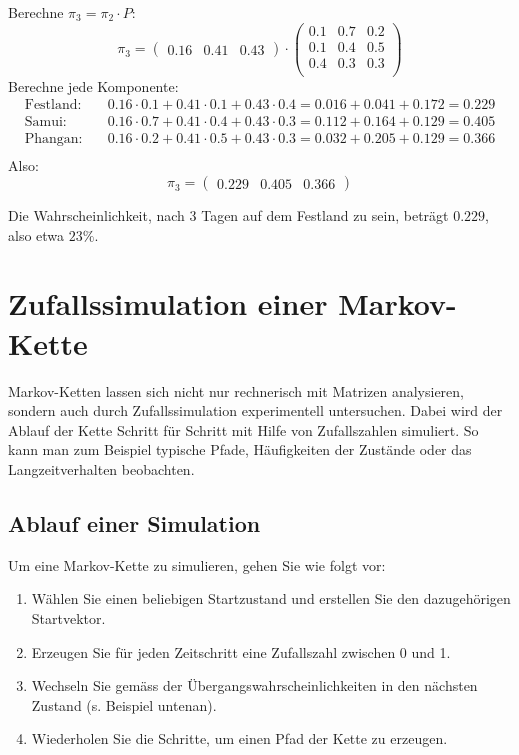 \begin{mychallenge}
\begin{myanswer}
        Berechne $\pi_3 = \pi_2 \cdot P$:
        \[
            \pi_3 = \begin{pmatrix} 0.16 & 0.41 & 0.43 \end{pmatrix}
            \cdot
            \begin{pmatrix}
                0.1 & 0.7 & 0.2 \\
                0.1 & 0.4 & 0.5 \\
                0.4 & 0.3 & 0.3 \\
            \end{pmatrix}
        \]
        Berechne jede Komponente:
        \begin{align*}
            \text{Festland:} & \quad 0.16 \cdot 0.1 + 0.41 \cdot 0.1 + 0.43 \cdot 0.4 = 0.016 + 0.041 + 0.172 = 0.229 \\
            \text{Samui:}    & \quad 0.16 \cdot 0.7 + 0.41 \cdot 0.4 + 0.43 \cdot 0.3 = 0.112 + 0.164 + 0.129 = 0.405 \\
            \text{Phangan:}  & \quad 0.16 \cdot 0.2 + 0.41 \cdot 0.5 + 0.43 \cdot 0.3 = 0.032 + 0.205 + 0.129 = 0.366 \\
        \end{align*}
        Also:
        \[
            \pi_3 = \begin{pmatrix} 0.229 & 0.405 & 0.366 \end{pmatrix}
        \]

        Die Wahrscheinlichkeit, nach 3 Tagen auf dem Festland zu sein, beträgt $0.229$, also etwa $23\%$.
    \end{myanswer}
\end{mychallenge}


\section{Zufallssimulation einer Markov-Kette}

Markov-Ketten lassen sich nicht nur rechnerisch mit Matrizen analysieren, sondern auch durch Zufallssimulation experimentell untersuchen. Dabei wird der Ablauf der Kette Schritt für Schritt mit Hilfe von Zufallszahlen simuliert. So kann man zum Beispiel typische Pfade, Häufigkeiten der Zustände oder das Langzeitverhalten beobachten.

\subsection{Ablauf einer Simulation}

Um eine Markov-Kette zu simulieren, gehen Sie wie folgt vor:
\begin{enumerate}
    \item Wählen Sie einen beliebigen Startzustand und erstellen Sie den dazugehörigen Startvektor.
    \item Erzeugen Sie für jeden Zeitschritt eine Zufallszahl zwischen 0 und 1.
    \item Wechseln Sie gemäss der Übergangswahrscheinlichkeiten in den nächsten Zustand (s. Beispiel untenan).
    \item Wiederholen Sie die Schritte, um einen Pfad der Kette zu erzeugen.
\end{enumerate}

